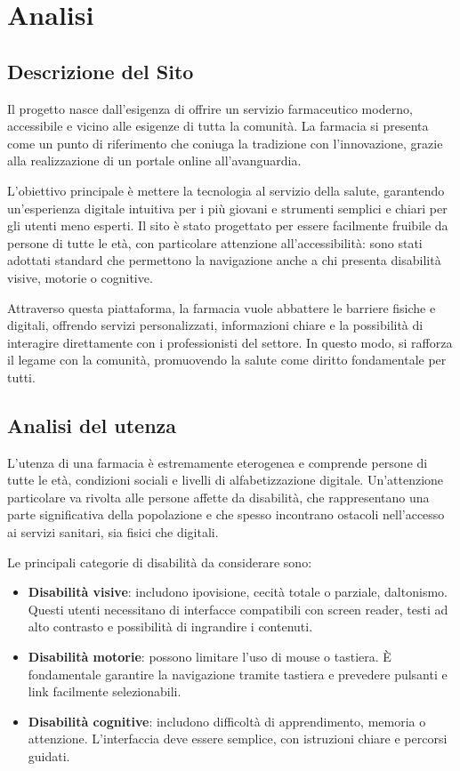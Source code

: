 \section{Analisi}
\subsection{Descrizione del Sito}
Il progetto nasce dall’esigenza di offrire un servizio farmaceutico moderno, accessibile e vicino alle esigenze di tutta la comunità. La farmacia si presenta come un punto di riferimento che coniuga la tradizione con l’innovazione, grazie alla realizzazione di un portale online all’avanguardia.

L’obiettivo principale è mettere la tecnologia al servizio della salute, garantendo un’esperienza digitale intuitiva per i più giovani e strumenti semplici e chiari per gli utenti meno esperti. Il sito è stato progettato per essere facilmente fruibile da persone di tutte le età, con particolare attenzione all’accessibilità: sono stati adottati standard che permettono la navigazione anche a chi presenta disabilità visive, motorie o cognitive.

Attraverso questa piattaforma, la farmacia vuole abbattere le barriere fisiche e digitali, offrendo servizi personalizzati, informazioni chiare e la possibilità di interagire direttamente con i professionisti del settore. In questo modo, si rafforza il legame con la comunità, promuovendo la salute come diritto fondamentale per tutti.

\subsection{Analisi del utenza}

L’utenza di una farmacia è estremamente eterogenea e comprende persone di tutte le età, condizioni sociali e livelli di alfabetizzazione digitale. Un’attenzione particolare va rivolta alle persone affette da disabilità, che rappresentano una parte significativa della popolazione e che spesso incontrano ostacoli nell’accesso ai servizi sanitari, sia fisici che digitali.

Le principali categorie di disabilità da considerare sono:
\begin{itemize}
    \item \textbf{Disabilità visive}: includono ipovisione, cecità totale o parziale, daltonismo. Questi utenti necessitano di interfacce compatibili con screen reader, testi ad alto contrasto e possibilità di ingrandire i contenuti.
    \item \textbf{Disabilità motorie}: possono limitare l’uso di mouse o tastiera. È fondamentale garantire la navigazione tramite tastiera e prevedere pulsanti e link facilmente selezionabili.
    \item \textbf{Disabilità cognitive}: includono difficoltà di apprendimento, memoria o attenzione. L’interfaccia deve essere semplice, con istruzioni chiare e percorsi guidati.
\end{itemize}

